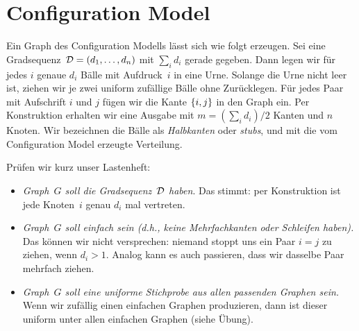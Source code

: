 \section{Configuration Model}
Ein Graph des Configuration Modells lässt sich wie folgt erzeugen.
Sei eine Gradsequenz~$\mathcal{D} = (d_1, \ldots, d_n)$ mit $\sum_i d_i$ gerade gegeben.
Dann legen wir für jedes $i$ genaue $d_i$ Bälle mit Aufdruck~$i$ in eine Urne.
Solange die Urne nicht leer ist, ziehen wir je zwei uniform zufällige Bälle ohne Zurücklegen.
Für jedes Paar mit Aufschrift $i$ und $j$ fügen wir die Kante $\left\{i, j\right\}$ in den Graph ein.
Per Konstruktion erhalten wir eine Ausgabe mit $m = (\sum_i d_i) / 2$ Kanten und $n$ Knoten.
Wir bezeichnen die Bälle als \emph{Halbkanten} oder \emph{stubs}, und mit \CMd die vom Configuration Model erzeugte Verteilung.

\medskip

\noindent
Prüfen wir kurz unser Lastenheft:
\begin{itemize}
    \item \emph{Graph~$G$ soll die Gradsequenz~$\mathcal{D}$ haben}.
          Das stimmt: per Konstruktion ist jede Knoten~$i$ genau $d_i$ mal vertreten.

    \item \emph{Graph~$G$ soll einfach sein (d.h., keine Mehrfachkanten oder Schleifen haben).}
          Das können wir nicht versprechen: niemand stoppt uns ein Paar $i = j$ zu ziehen, wenn $d_i > 1$.
          Analog kann es auch passieren, dass wir dasselbe Paar mehrfach ziehen.

    \item \emph{Graph~$G$ soll eine uniforme Stichprobe aus allen passenden Graphen sein.}
          Wenn wir zufällig einen einfachen Graphen produzieren, dann ist dieser uniform unter allen einfachen Graphen (siehe Übung).
\end{itemize}


